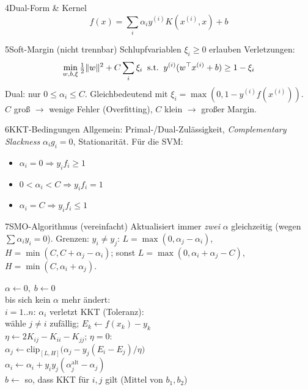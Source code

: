 \begin{hngrid}
\begin{hnp}[raster multicolumn=3,acc=hnnavy]{4}{Dual-Form \& Kernel}
\[ f(x)=\sum_i\alpha_iy^{(i)}K(x^{(i)},x)+b \]
\end{hnp}
%
\begin{hnp}[raster multicolumn=3,acc=hngreen]{5}{Soft-Margin (nicht trennbar)}
Schlupfvariablen $\xi_i\ge0$ erlauben Verletzungen:
\[ \min_{w,b,\xi}\tfrac12\|w\|^2+C\sum_i\xi_i\;\;\text{s.t.}\;\;y^{(i)}(w^{\top} x^{(i)}+b)\ge1-\xi_i \]
Dual: nur $0\le\alpha_i\le C$. Gleichbedeutend mit  $\xi_i=\max(0,1-y^{(i)}f(x^{(i)}))$.\\
$C$ groß $\to$ wenige Fehler (Overfitting), $C$ klein $\to$ großer Margin.
\end{hnp}
%
\begin{hnp}[raster multicolumn=2,acc=hnrose]{6}{KKT-Bedingungen}
Allgemein: Primal-/Dual-Zulässigkeit, \emph{Complementary Slackness} $\alpha_ig_i=0$, Stationarität. Für die SVM:
\begin{itemize}
\item $\alpha_i=0\Rightarrow y_if_i\ge1$
\item $0<\alpha_i<C\Rightarrow y_if_i=1$
\item $\alpha_i=C\Rightarrow y_if_i\le1$
\end{itemize}
\end{hnp}
%
\begin{hnp}[raster multicolumn=4,acc=hnpurple]{7}{SMO-Algorithmus (vereinfacht)}
Aktualisiert immer \emph{zwei} $\alpha$ gleichzeitig (wegen $\sum\alpha_iy_i=0$). Grenzen: $y_i\ne y_j$: $L=\max(0,\alpha_j-\alpha_i)$, $H=\min(C,C+\alpha_j-\alpha_i)$; sonst $L=\max(0,\alpha_i+\alpha_j-C)$, $H=\min(C,\alpha_i+\alpha_j)$.
\begin{pcode}
$\alpha\leftarrow0,\;b\leftarrow0$\\
 bis sich kein $\alpha$ mehr ändert:\\
\hii {} $i=1..n$:  $\alpha_i$ verletzt KKT (Toleranz):\\
\hiii wähle $j\ne i$ zufällig; $E_k\leftarrow f(x_k)-y_k$\\
\hiii $\eta\leftarrow2K_{ij}-K_{ii}-K_{jj}$;\;  $\eta=0$: \\
\hiii $\alpha_j\leftarrow\mathrm{clip}_{[L,H]}\bigl(\alpha_j-y_j(E_i-E_j)/\eta\bigr)$\\
\hiii $\alpha_i\leftarrow\alpha_i+y_iy_j(\alpha_j^{\mathrm{alt}}-\alpha_j)$\\
\hiii $b\leftarrow$ so, dass KKT für $i,j$ gilt (Mittel von $b_1,b_2$)
\end{pcode}
\end{hnp}

\end{hngrid}
